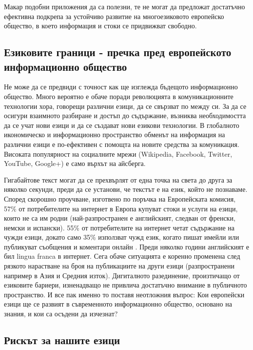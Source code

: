 \documentclass[]{../../metanetpaper}
\begin{document}
\begin{multicols}{2}
Макар подобни приложения да са полезни, те не могат да предложат достатъчно ефективна подкрепа за устойчиво развитие на многоезиковото европейско общество, в което информация и стоки се придвижват свободно.

\subsection{Езиковите граници - пречка пред европейското информационно общество}
  
Не може да се предвиди с точност как ще изглежда
бъдещото информационно общество. Много вероятно е обаче поради революцията в комуникационните технологии хора, говорещи различни езици, да се свързват по между си.
За да се осигури взаимното разбиране и достъп до съдържание, възниква необходимостта да се учат нови езици и да се създават нови езикови технологии. В глобалното икономическо и информационно пространство обменът на информация на различни езици е по-ефективен с помощта на новите средства за комуникация. Високата популярност на социалните мрежи  (Wikipedia, Facebook, Twitter, YouTube, Google+)  е само върхът на айсберга.


Гигабайтове текст могат да се прехвърлят от една точка на света до друга за няколко секунди, преди да се установи, че текстът е на език, който не познаваме. Според скорошно проучване, изготвено по поръчка на Европейската
 комисия, 57\% от потребителите на интернет в Европа
 купуват стоки и услуги на езици, които не са им родни
 (най-разпространен е английският, следван от
 френски, немски и испански). 55\% от потребителите на интернет четат съдържание на чужди езици, докато само 35\% използват чужд език, когато пишат имейли или публикуват съобщения и коментари онлайн \cite{EC1}. Преди няколко
 години английският е бил lingua franca в интернет. Сега обаче ситуацията е коренно променена след  рязкото нарастване  на броя на публикациите на други езици (разпространени например в Азия и Средния изток). Дигиталното разединение, произтичащо от езиковите бариери, 
 изненадващо не привлича достатъчно внимание в публичното
 пространство. И все пак именно то поставя неотложния
 въпрос: Кои европейски езици ще се развият в съвременното информационно общество, основано на знания, и кои са осъдени да изчезнат?

\subsection{Рискът за нашите езици}


\end{multicols}
\end{document}
